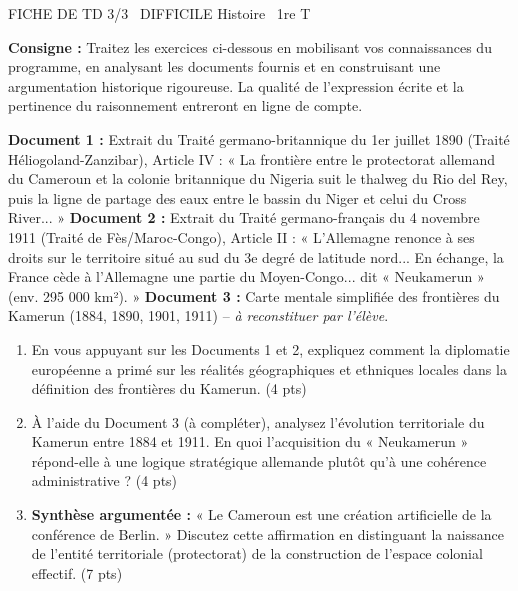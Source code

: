 \documentclass[11pt]{article}
\begin{document}
\begin{tcolorbox}[enhanced,colback=popink,colframe=popink,arc=10pt,boxrule=0pt,left=12pt,right=12pt,top=9pt,bottom=9pt]
{\color{white}\popxbold\small FICHE DE TD 3/3 \textbullet\ DIFFICILE \hfill Histoire \textbullet\ 1re T\par}
\end{tcolorbox}
\vspace{4pt}
\noindent\textbf{Consigne :} Traitez les exercices ci-dessous en mobilisant vos connaissances du programme, en analysant les documents fournis et en construisant une argumentation historique rigoureuse. La qualité de l'expression écrite et la pertinence du raisonnement entreront en ligne de compte.

\begin{exercice}
\textbf{Document 1 :} Extrait du Traité germano-britannique du 1er juillet 1890 (Traité Héliogoland-Zanzibar), Article IV : « La frontière entre le protectorat allemand du Cameroun et la colonie britannique du Nigeria suit le thalweg du Rio del Rey, puis la ligne de partage des eaux entre le bassin du Niger et celui du Cross River... »
\textbf{Document 2 :} Extrait du Traité germano-français du 4 novembre 1911 (Traité de Fès/Maroc-Congo), Article II : « L'Allemagne renonce à ses droits sur le territoire situé au sud du 3e degré de latitude nord... En échange, la France cède à l'Allemagne une partie du Moyen-Congo... dit « Neukamerun » (env. 295 000 km²). »
\textbf{Document 3 :} Carte mentale simplifiée des frontières du Kamerun (1884, 1890, 1901, 1911) -- \textit{à reconstituer par l'élève}.

\begin{enumerate}
    \item En vous appuyant sur les Documents 1 et 2, expliquez comment la diplomatie européenne a primé sur les réalités géographiques et ethniques locales dans la définition des frontières du Kamerun. (4 pts)
    \item À l'aide du Document 3 (à compléter), analysez l'évolution territoriale du Kamerun entre 1884 et 1911. En quoi l'acquisition du « Neukamerun » répond-elle à une logique stratégique allemande plutôt qu'à une cohérence administrative ? (4 pts)
    \item \textbf{Synthèse argumentée :} « Le Cameroun est une création artificielle de la conférence de Berlin. » Discutez cette affirmation en distinguant la naissance de l'entité territoriale (protectorat) de la construction de l'espace colonial effectif. (7 pts)
\end{enumerate}
\end{exercice}
\end{document}
